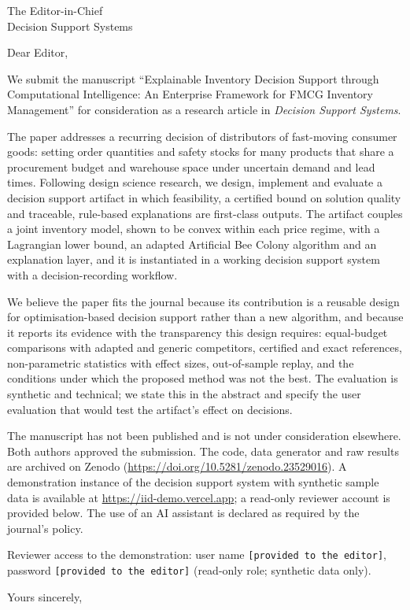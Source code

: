 \documentclass[11pt]{letter}
\begin{document}
\begin{letter}{The Editor-in-Chief\\Decision Support Systems}
\opening{Dear Editor,}

We submit the manuscript ``Explainable Inventory Decision Support through Computational Intelligence: An Enterprise Framework for FMCG Inventory Management'' for consideration as a research article in \emph{Decision Support Systems}.

The paper addresses a recurring decision of distributors of fast-moving consumer goods: setting order quantities and safety stocks for many products that share a procurement budget and warehouse space under uncertain demand and lead times. Following design science research, we design, implement and evaluate a decision support artifact in which feasibility, a certified bound on solution quality and traceable, rule-based explanations are first-class outputs. The artifact couples a joint inventory model, shown to be convex within each price regime, with a Lagrangian lower bound, an adapted Artificial Bee Colony algorithm and an explanation layer, and it is instantiated in a working decision support system with a decision-recording workflow.

We believe the paper fits the journal because its contribution is a reusable design for optimisation-based decision support rather than a new algorithm, and because it reports its evidence with the transparency this design requires: equal-budget comparisons with adapted and generic competitors, certified and exact references, non-parametric statistics with effect sizes, out-of-sample replay, and the conditions under which the proposed method was not the best. The evaluation is synthetic and technical; we state this in the abstract and specify the user evaluation that would test the artifact's effect on decisions.

The manuscript has not been published and is not under consideration elsewhere. Both authors approved the submission. The code, data generator and raw results are archived on Zenodo (\url{https://doi.org/10.5281/zenodo.23529016}). A demonstration instance of the decision support system with synthetic sample data is available at \url{https://iid-demo.vercel.app}; a read-only reviewer account is provided below. The use of an AI assistant is declared as required by the journal's policy.

\medskip\noindent Reviewer access to the demonstration: user name \texttt{[provided to the editor]}, password \texttt{[provided to the editor]} (read-only role; synthetic data only).

\closing{Yours sincerely,}
\end{letter}
\end{document}
